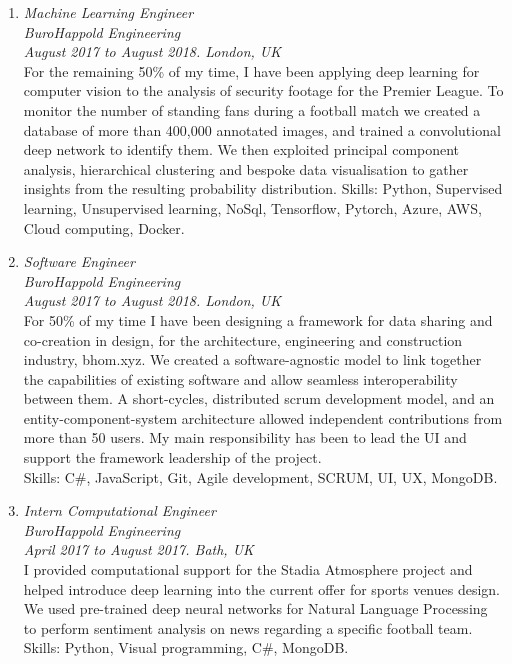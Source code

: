 \begin{enumerate}[leftmargin=0.45cm, itemsep=1em, topsep=0.5em, parsep=0.2em]
        \item
        \emph{Machine Learning Engineer} \\
        \emph{BuroHappold Engineering} \\
        \textit{August 2017 to August 2018. London, UK} \vspace{0.2em} \\
        {For the remaining 50\% of my time, I have been applying deep learning for computer vision to the analysis of security footage for the Premier League. To monitor the number of standing fans during a football match we created a database of more than 400,000 annotated images, and trained a convolutional deep network to identify them. We then exploited principal component analysis, hierarchical clustering and bespoke data visualisation to gather insights from the resulting probability distribution.}
        Skills: Python, Supervised learning, Unsupervised learning, NoSql, Tensorflow, Pytorch, Azure, AWS, Cloud computing, Docker.

        \item
        \emph{Software Engineer} \\
        \emph{BuroHappold Engineering} \\
        \textit{August 2017 to August 2018. London, UK}  \vspace{0.2em} \\
        {For 50\% of my time I have been designing a framework for data sharing and co-creation in design, for the architecture, engineering and construction industry, bhom.xyz. We created a software-agnostic model to link together the capabilities of existing software and allow seamless interoperability between them. A short-cycles, distributed scrum development model, and an entity-component-system architecture allowed independent contributions from more than 50 users. My main responsibility has been to lead the UI and support the framework leadership of the project.} \\
        Skills: C\#, JavaScript, Git, Agile development, SCRUM, UI, UX, MongoDB.

        \item
        \emph{Intern Computational Engineer} \\
        \emph{BuroHappold Engineering} \\
        \textit{April 2017 to August 2017. Bath, UK} \vspace{0.2em} \\
        {I provided computational support for the Stadia Atmosphere project and helped introduce deep learning into the current offer for sports venues design. We used pre-trained deep neural networks for Natural Language Processing to perform sentiment analysis on news regarding a specific football team.} \\
        Skills: Python, Visual programming, C\#, MongoDB.


\end{enumerate}
